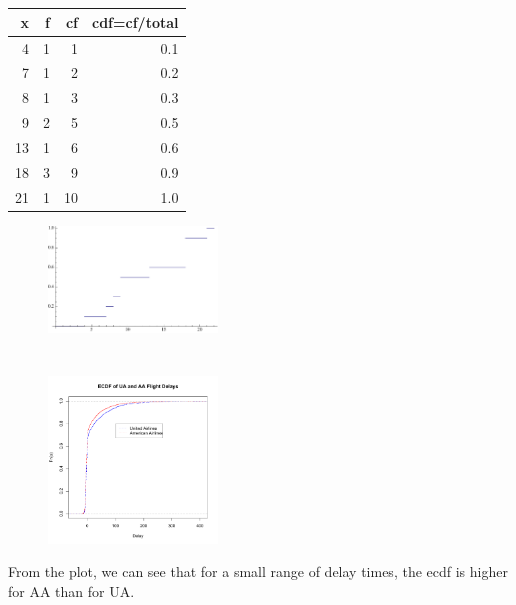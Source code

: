 \documentclass[twocolumn]{article}
\newcommand{\setsection}[1]{\setcounter{section}{#1}\addtocounter{section}{-1}\section{}}
\begin{document}
\setsection{15}
\begin{table}[h]
\centering
\begin{tabular}{@{}rrrr@{}}
\toprule
x  & f & cf & cdf=cf/total \\ \midrule
4  & 1 & 1  & 0.1          \\
7  & 1 & 2  & 0.2          \\
8  & 1 & 3  & 0.3          \\
9  & 2 & 5  & 0.5          \\
13 & 1 & 6  & 0.6          \\
18 & 3 & 9  & 0.9          \\
21 & 1 & 10 & 1.0          \\ \bottomrule
\end{tabular}
\end{table}
\begin{figure}[!ht]
\centering
\includegraphics[width=0.4\textwidth]{15b.pdf}
\end{figure}

\newpage

\setsection{17}
\begin{figure}[!ht]
\centering
\includegraphics[width=0.4\textwidth]{17.pdf}
\end{figure}

From the plot, we can see that for a small range of delay times, the ecdf is higher for AA than for UA.
\end{document}

